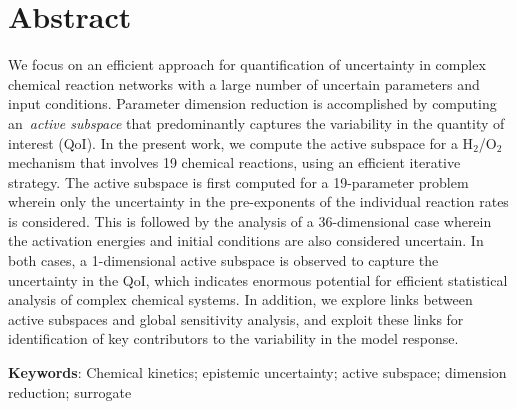 \section*{Abstract}
We focus on an efficient approach for quantification of uncertainty in complex chemical
reaction networks with a large number of uncertain parameters and input conditions.  Parameter
dimension reduction is accomplished by computing an~\emph{active subspace} that
predominantly captures the variability in the quantity of interest (QoI).  In
the present work, we compute the active subspace for a H$_2$/O$_2$ mechanism 
that involves 19 chemical reactions, using an efficient iterative strategy.  The
active subspace is first computed for a 19-parameter problem wherein only the
uncertainty in the pre-exponents of the individual reaction rates is
considered. This is followed by the analysis of a 36-dimensional case wherein
the activation energies and initial conditions are also considered uncertain.  In both cases, a
1-dimensional active subspace is observed to capture the uncertainty in the QoI,
 which indicates enormous
potential for efficient statistical analysis of complex chemical systems. In
addition, we explore links between active subspaces and global sensitivity
analysis, and exploit these links for identification of key
contributors to the variability in the model response.
\bigskip

\noindent \textbf{Keywords}: Chemical kinetics; epistemic uncertainty; active subspace; dimension reduction; surrogate
